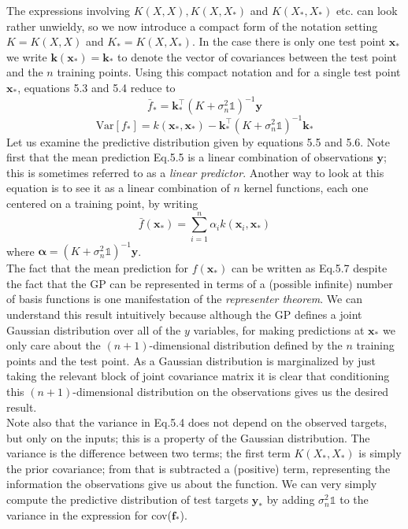 \documentclass[twoside]{article}
\begin{document}
The expressions involving $K(X, X), K(X, X_*)$ and $K(X_*, X_*)$ etc. can look rather unwieldy, so we now introduce a compact form of the notation setting $K = K(X, X)$ and $K_* = K(X, X_*)$. In the case there is only one test point $\boldsymbol{x}_*$ we write $\boldsymbol{k}(\boldsymbol{x_*}) = \boldsymbol{k_*}$ to denote the vector of covariances between the test point and the $n$ training points. Using this compact notation and for a single test point $\boldsymbol{x}_*$, equations 5.3 and 5.4 reduce to
\begin{equation}
    \bar{f}_* = \boldsymbol{k}_*^\intercal(K + \sigma^2_n\mathds{1})^{-1}\boldsymbol{y}
\end{equation}
\begin{equation}
    \text{Var}[f_*] = k(\boldsymbol{x}_*, \boldsymbol{x}_*) - \boldsymbol{k}_*^\intercal(K + \sigma^2_n\mathds{1})^{-1}\boldsymbol{k}_*
\end{equation}
Let us examine the predictive distribution given by equations 5.5 and 5.6. Note first that the mean prediction Eq.5.5 is a linear combination of observations $\boldsymbol{y}$; this is sometimes referred to as a \textit{linear predictor}. Another way to look at this equation is to see it as a linear combination of $n$ kernel functions, each one centered on a training point, by writing
\begin{equation}
    \bar{f}(\boldsymbol{x}_*) = \sum\limits_{i = 1}^{n} \alpha_i k(\boldsymbol{x}_i, \boldsymbol{x}_*)
\end{equation}
where $\boldsymbol{\alpha} = (K + \sigma^2_n\mathds{1})^{-1}\boldsymbol{y}$.\\
The fact that the mean prediction for $f(\boldsymbol{x}_*)$ can be written as Eq.5.7 despite the fact that the GP can be represented in terms of a (possible infinite) number of basis functions is one manifestation of the \textit{representer theorem}. We can understand this result intuitively because although the GP defines a joint Gaussian distribution over all of the $y$ variables, for making predictions at $\boldsymbol{x}_*$ we only care about the $(n + 1)$-dimensional distribution defined by the $n$ training points and the test point. As a Gaussian distribution is marginalized by just taking the relevant block of joint covariance matrix it is clear that conditioning this $(n + 1)$-dimensional distribution on the observations gives us the desired result.\\
Note also that the variance in Eq.5.4 does not depend on the observed targets, but only on the inputs; this is a property of the Gaussian distribution. The variance is the difference between two terms; the first term $K(X_*, X_*)$ is simply the prior covariance; from that is subtracted a (positive) term, representing the information the observations give us about the function. We can very simply compute the predictive distribution of test targets $\boldsymbol{y}_*$ by adding $\sigma^2_n\mathds{1}$ to the variance in the expression for cov($\textbf{f}_*$).\medskip
\end{document}
